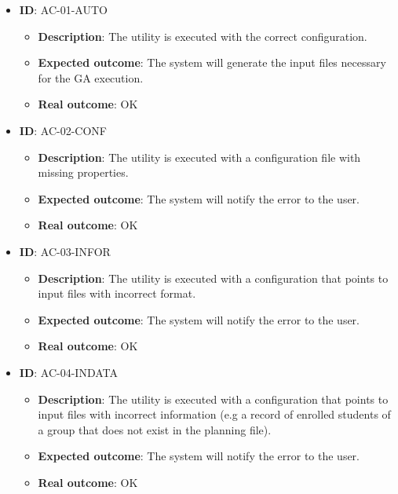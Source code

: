 \begin{itemize}
    \item \textbf{ID}: AC-01-AUTO
        \begin{itemize}
            \item \textbf{Description}: The utility is executed with the correct configuration.
            \item \textbf{Expected outcome}: The system will generate the input files necessary for the GA execution.
            \item \textbf{Real outcome}: OK
        \end{itemize}
    \item \textbf{ID}: AC-02-CONF
        \begin{itemize}
            \item \textbf{Description}: The utility is executed with a configuration file with missing properties.
            \item \textbf{Expected outcome}: The system will notify the error to the user.
            \item \textbf{Real outcome}: OK
        \end{itemize}
    \item \textbf{ID}: AC-03-INFOR
        \begin{itemize}
            \item \textbf{Description}: The utility is executed with a configuration that points to input files with incorrect format.
            \item \textbf{Expected outcome}: The system will notify the error to the user.
            \item \textbf{Real outcome}: OK
        \end{itemize}
    \item \textbf{ID}: AC-04-INDATA
        \begin{itemize}
            \item \textbf{Description}: The utility is executed with a configuration that points to input files with incorrect information (e.g a record of enrolled students of a group that does not exist in the planning file).
            \item \textbf{Expected outcome}: The system will notify the error to the user.
            \item \textbf{Real outcome}: OK
        \end{itemize}
\end{itemize}

